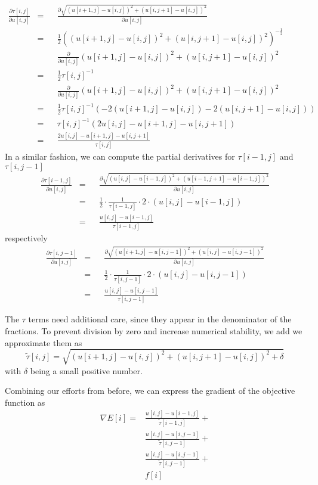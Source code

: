 \documentclass{paper}
\begin{document}
\begin{align}
\frac{\partial \tau[i,j]}{\partial u[i,j]} 
&= &&\frac{\partial \sqrt{(u[i+1,j] - u[i,j])^2 + (u[i, j+1] - u[i, j])^2}}{\partial u[i,j]} \\
&= &&\frac{1}{2} ((u[i+1,j] - u[i,j])^2 + (u[i, j+1] - u[i, j])^2)^{-\frac{1}{2}} \\
& &&\frac{\partial}{\partial u[i,j]} 
(u[i+1,j] - u[i,j])^2 + (u[i, j+1] - u[i, j])^2 \\
&= &&\frac{1}{2}\tau[i,j]^{-1} \\
& &&\frac{\partial}{\partial u[i,j]} 
(u[i+1,j] - u[i,j])^2 + (u[i, j+1] - u[i, j])^2 \\
&= &&\frac{1}{2}\tau[i,j]^{-1}
(-2(u[i + 1, j] - u[i,j]) - 2(u[i, j+1] - u[i,j])) \\
&= &&\tau[i,j]^{-1} (2 u[i,j] -u[i + 1, j] - u[i, j+1]) \\
&= &&\frac{2u[i,j] - u[i + 1, j] - u[i, j+1]}{\tau[i,j]}
\end{align}
In a similar fashion, we can compute the partial derivatives for
$\tau[i-1, j]$ and $\tau[i, j - 1]$
\begin{align}
\frac{\partial \tau[i - 1,j]}{\partial u[i,j]} 
&= &&\frac{\partial \sqrt{(u[i,j] - u[i-1,j])^2 + (u[i-1, j+1] - u[i-1, j])^2}}{\partial u[i,j]} \\
&= &&\frac{1}{2} \cdot \frac{1}{\tau[i - 1, j]} \cdot 2 \cdot (u[i,j] - u[i-1, j]) \\
&= &&\frac{u[i,j] - u[i-1, j]}{\tau[i - 1, j]}
\end{align}
respectively
\begin{align}
\frac{\partial \tau[i,j-1]}{\partial u[i,j]} 
&= &&\frac{\partial \sqrt{(u[i + 1 ,j] - u[i,j - 1])^2 + (u[i, j] - u[i, j - 1])^2}}{\partial u[i,j]} \\
&= &&\frac{1}{2} \cdot \frac{1}{\tau[i, j - 1]} \cdot 2 \cdot (u[i,j] - u[i, j-1]) \\
&= &&\frac{u[i,j] - u[i, j - 1]}{\tau[i, j-1]}
\end{align}

The $\tau$ terms need additional care, since they appear in the denominator
of the fractions. To prevent division by zero and increase numerical 
stability, we add we approximate them as 
\begin{equation}
\tilde{\tau}[i,j] = \sqrt{(u[i+1,j] - u[i,j])^2 + (u[i, j+1] - u[i, j])^2 + \delta}
\end{equation}
with $\delta$ being a small positive number.

Combining our efforts from before, we can express the gradient of the objective function as
\begin{align}
\nabla E[i] = &\frac{u[i,j] - u[i-1, j]}{\tilde{\tau}[i - 1, j]} + \\
	&\frac{u[i,j] - u[i, j - 1]}{\tilde{\tau}[i, j-1]} + \\
	&\frac{u[i,j] - u[i, j - 1]}{\tilde{\tau}[i, j-1]} + \\
	&f[i]
\end{align}
\end{document}
